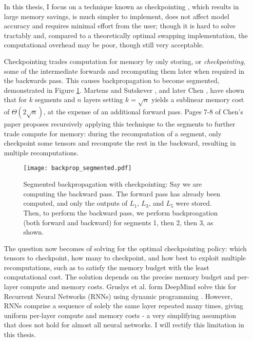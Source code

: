 In this thesis, I focus on a technique known as checkpointing \cite{Dauvergne2006, Martens2012, Siskind2018, Chen2016, Gruslys2016, Wang2018}, which results in large memory savings, is much simpler to implement, does not affect model accuracy and requires minimal effort from the user; though it is hard to solve tractably and, compared to a theoretically optimal swapping implementation, the computational overhead may be poor, though still very acceptable. 

Checkpointing trades computation for memory by only storing, or \textit{checkpointing}, some of the intermediate forwards and recomputing them later when required in the backwards pass. This causes backpropagation to become segmented, demonstrated in Figure \ref{fig:1-backprop-segmented}.  Martens and Sutskever \cite{Martens2012}, and later Chen \cite{Chen2016}, have shown that for \(k\) segments and \(n\) layers setting \(k = \sqrt{n}\) yields a sublinear memory cost of \(\Theta (2\sqrt{n})\), at the expense of an additional forward pass. Pages 7-8 of Chen's paper proposes recursively applying this technique to the segments to further trade compute for memory: during the recomputation of a segment, only checkpoint some tensors and recompute the rest in the backward, resulting in multiple recomputations.

\begin{figure}[t]
    \centering
    \texttt{[image: backprop\_segmented.pdf]}
    \caption{Segmented backpropagation with checkpointing: Say we are computing the backward pass. The forward pass has already been computed, and only the outputs of \(L_1\), \(L_3\), and \(L_5\) were stored. Then, to perform the backward pass, we perform backproagation (both forward and backward) for segments 1, then 2, then 3, as shown.}
    \label{fig:1-backprop-segmented}
\end{figure}

The question now becomes of solving for the optimal checkpointing policy: which tensors to checkpoint, how many to checkpoint, and how best to exploit multiple recomputations, such as to satisfy the memory budget with the least computational cost. The solution depends on the precise memory budget and per-layer compute and memory costs. Gruslys et al. form DeepMind solve this for Recurrent Neural Networks (RNNs) using dynamic programming \cite{Gruslys2016}. However, RNNs comprise a sequence of solely the same layer repeated many times, giving uniform per-layer compute and memory costs - a very simplifying assumption that does not hold for almost all neural networks. I will rectify this limitation in this thesis.

